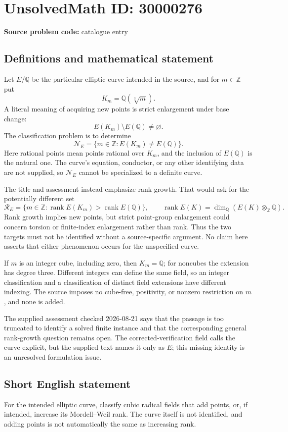 \documentclass[11pt]{article}
\newcommand{\Z}{\mathbb{Z}}
\newcommand{\Q}{\mathbb{Q}}
\begin{document}
\section*{UnsolvedMath ID: 30000276}
\textbf{Source problem code:} catalogue entry
\subsection{Definitions and mathematical statement}
Let \(E/\Q\) be the particular elliptic curve intended in the source, and for \(m\in\Z\) put
\[
K_m=\Q(\sqrt[3]{m}).
\]
A literal meaning of acquiring new points is strict enlargement under base change:
\[
E(K_m)\setminus E(\Q)\ne\varnothing.
\]
The classification problem is to determine
\[
\mathcal N_E=\{m\in\Z:E(K_m)\ne E(\Q)\}.
\]
Here rational points mean points rational over \(K_m\), and the inclusion of \(E(\Q)\) is the natural one. The curve's equation, conductor, or any other identifying data are not supplied, so \(\mathcal N_E\) cannot be specialized to a definite curve.

The title and assessment instead emphasize rank growth. That would ask for the potentially different set
\[
\mathcal R_E=\{m\in\Z:\operatorname{rank}E(K_m)>\operatorname{rank}E(\Q)\},
\qquad
\operatorname{rank}E(K)=\dim_{\Q}(E(K)\otimes_{\Z}\Q).
\]
Rank growth implies new points, but strict point-group enlargement could concern torsion or finite-index enlargement rather than rank. Thus the two targets must not be identified without a source-specific argument. No claim here asserts that either phenomenon occurs for the unspecified curve.

If \(m\) is an integer cube, including zero, then \(K_m=\Q\); for noncubes the extension has degree three. Different integers can define the same field, so an integer classification and a classification of distinct field extensions have different indexing. The source imposes no cube-free, positivity, or nonzero restriction on \(m\), and none is added.

The supplied assessment checked 2026-08-21 says that the passage is too truncated to identify a solved finite instance and that the corresponding general rank-growth question remains open. The corrected-verification field calls the curve explicit, but the supplied text names it only as \(E\); this missing identity is an unresolved formulation issue.
\subsection{Short English statement}
For the intended elliptic curve, classify cubic radical fields that add points, or, if intended, increase its Mordell--Weil rank. The curve itself is not identified, and adding points is not automatically the same as increasing rank.
\end{document}
